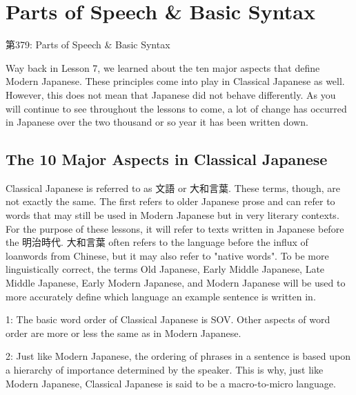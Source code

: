     
\chapter{Parts of Speech \& Basic Syntax}

\begin{center}
\begin{Large}
第379: Parts of Speech \& Basic Syntax 
\end{Large}
\end{center}
 
\par{ Way back in Lesson 7, we learned about the ten major aspects that define Modern Japanese. These principles come into play in Classical Japanese as well. However, this does not mean that Japanese did not behave differently. As you will continue to see throughout the lessons to come, a lot of change has occurred in Japanese over the two thousand or so year it has been written down. }
      
\section{The 10 Major Aspects in Classical Japanese}
 
\par{ Classical Japanese is referred to as 文語 or 大和言葉. These terms, though, are not exactly the same. The first refers to older Japanese prose and can refer to words that may still be used in Modern Japanese but in very literary contexts. For the purpose of these lessons, it will refer to texts written in Japanese before the 明治時代. 大和言葉 often refers to the language before the influx of loanwords from Chinese, but it may also refer to "native words". To be more linguistically correct, the terms Old Japanese, Early Middle Japanese, Late Middle Japanese, Early Modern Japanese, and Modern Japanese will be used to more accurately define which language an example sentence is written in. }

\par{1: The basic word order of Classical Japanese is SOV. Other aspects of word order are more or less the same as in Modern Japanese. }

\par{2: Just like Modern Japanese, the ordering of phrases in a sentence is based upon a hierarchy of importance determined by the speaker. This is why, just like Modern Japanese, Classical Japanese is said to be a macro-to-micro language. }

